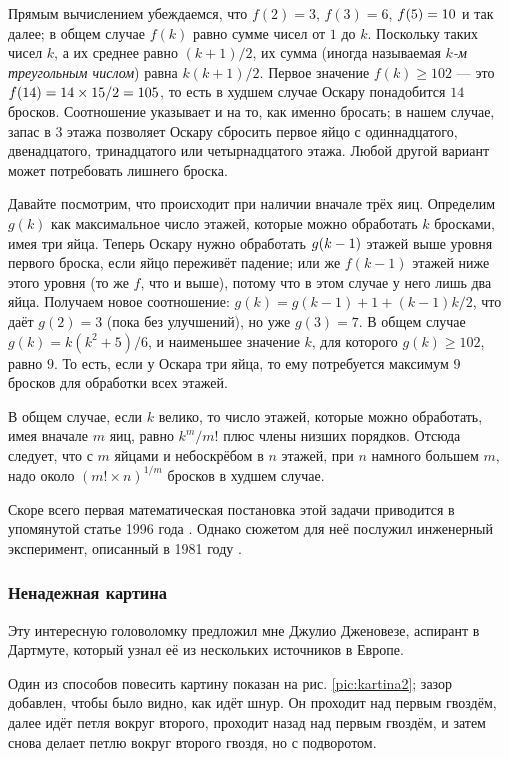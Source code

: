 Прямым вычислением убеждаемся, что $f(2) = 3$, $f(3) = 6$, $f(5) \z= 10$ и так далее; в общем случае $f(k)$ равно сумме чисел от $1$ до $k$.
Поскольку таких чисел $k$, а их среднее равно $(k + 1)/2$, их сумма (иногда называемая \emph{$k$-м треугольным числом}) равна $k(k + 1)/2$.
Первое значение $f(k)\ge 102$ --- это $f(14) \z= 14 \times 15/2 \z= 105$, то есть в худшем случае Оскару понадобится $14$ бросков.
Соотношение указывает и на то, как именно бросать;
в нашем случае, запас в 3 этажа позволяет Оскару сбросить первое яйцо с одиннадцатого, двенадцатого, тринадцатого или четырнадцатого этажа.
Любой другой вариант может потребовать лишнего броска.

Давайте посмотрим, что происходит при наличии вначале трёх яиц.
Определим $g(k)$ как максимальное число этажей, которые можно обработать $k$ бросками, имея три яйца.
Теперь Оскару нужно обработать $g(k \z- 1)$ этажей выше уровня первого броска, если яйцо переживёт падение;
или же $f(k - 1)$ этажей ниже этого уровня (то же $f$, что и выше), потому что в этом случае у него лишь два яйца.
Получаем новое соотношение: $g(k) = g(k-1) + 1 + (k - 1)k/2$, что даёт $g(2) = 3$ (пока без улучшений), но уже $g(3) = 7$.
В общем случае $g(k)=k(k^2+5)/6$, и наименьшее значение $k$, для которого $g(k)\ge 102$, равно $9$.
То есть, если у Оскара три яйца, то ему потребуется максимум 9 бросков для обработки всех этажей.

В общем случае, если $k$ велико, то число этажей, которые можно обработать, имея вначале $m$ яиц, равно $k^m/m!$ плюс члены низших порядков.
Отсюда следует, что с $m$ яйцами и небоскрёбом в $n$ этажей, при $n$ намного большем $m$, надо около $(m!\times n)^{1/m}$ бросков в худшем случае.

\begin{addedbytheeditors}
Скоре всего первая математическая постановка этой задачи приводится в упомянутой статье 1996 года \cite{42}.
Однако сюжетом для неё послужил инженерный эксперимент, описанный в 1981 году \cite{cowan1982design}.\pr
\end{addedbytheeditors}

\subsubsection*{Ненадежная картина}

Эту интересную головоломку предложил мне Джулио Дженовезе, аспирант в Дартмуте, который узнал её из нескольких источников в Европе.

Один из способов повесить картину показан на рис. \ref{pic:kartina2};
зазор добавлен, чтобы было видно, как идёт шнур.
Он проходит над первым гвоздём,
далее идёт петля вокруг второго,
проходит назад над первым гвоздём,
и затем снова делает петлю вокруг второго гвоздя, но с подворотом.

